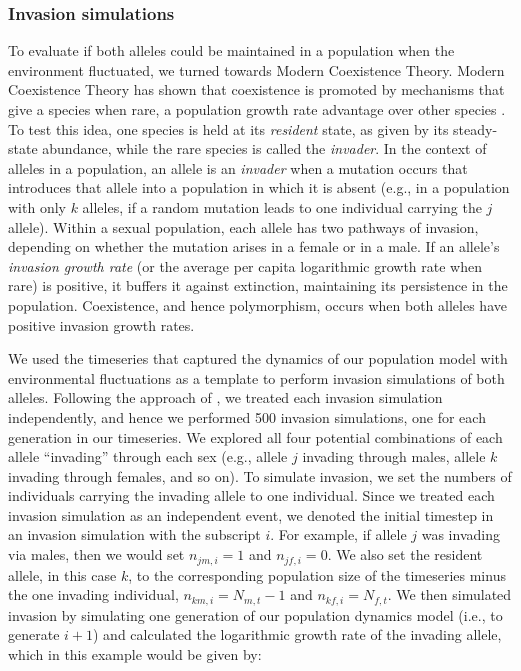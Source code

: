 \documentclass[12pt]{article}
\begin{document}
\subsubsection*{Invasion simulations}

 To evaluate if both alleles could be maintained in a population when the environment fluctuated, we turned towards Modern Coexistence Theory. Modern Coexistence Theory has shown that coexistence is promoted by mechanisms that give a species when rare, a population growth rate advantage over other species \citep{chesson_stabilizing_1982, chesson2003quantifying, barabas_chessons_2018}. To test this idea, one species is held at its \textit{resident} state, as given by its steady-state abundance, while the rare species is called the \textit{invader}. In the context of alleles in a population, an allele is an \textit{invader} when a mutation occurs that introduces that allele into a population in which it is absent (e.g., in a population with only $k$ alleles, if a random mutation leads to one individual carrying the $j$ allele). Within a sexual population, each allele has two pathways of invasion, depending on whether the mutation arises in a female or in a male. If an allele's \textit{invasion growth rate} (or the average per capita logarithmic growth rate when rare) is positive, it buffers it against extinction, maintaining its persistence in the population.  Coexistence, and hence polymorphism, occurs when both alleles have positive invasion growth rates.

We used the timeseries that captured the dynamics of our population model with environmental fluctuations as a template to perform invasion simulations of both alleles. Following the approach of \citet{ellner2016quantify}, we treated each invasion simulation independently, and hence we performed 500 invasion simulations, one for each generation in our timeseries. We explored all four potential combinations of each allele ``invading'' through each sex (e.g., allele $j$ invading through males, allele $k$ invading through females, and so on). To simulate invasion, we set the numbers of individuals carrying the invading allele to one individual. Since we treated each invasion simulation as an independent event, we denoted the initial timestep in an invasion simulation with the subscript $i$. For example, if allele $j$ was invading via males, then we would set $n_{jm,i} = 1$ and $n_{jf,i}= 0$. We also set the resident allele, in this case $k$, to the corresponding population size of the timeseries minus the one invading individual, $n_{km,i} = N_{m,t} -1$ and $n_{kf,i} = N_{f,t}$. We then simulated invasion by simulating one generation of our population dynamics model (i.e., to generate $i+1$) and calculated the logarithmic growth rate of the invading allele, which in this example would be given by:
\end{document}
